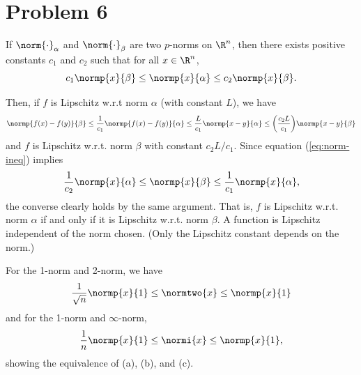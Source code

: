 \documentclass{homework}
\begin{document}
\section{Problem 6}
If $\norm{\cdot}_\alpha$ and $\norm{\cdot}_\beta$ are two $p$-norms on $\R^n$,
then there exists positive constants $c_1$ and $c_2$ such that for all $x\in\R^n$,
\begin{equation}
    c_1 \normp{x}{\beta} \leq \normp{x}{\alpha} \leq c_2 \normp{x}{\beta}.
    \label{eq:norm-ineq}
\end{equation}

Then, if $f$ is Lipschitz w.r.t norm $\alpha$ (with constant $L$), we have
\begin{equation}
    \normp{f(x) - f(y)}{\beta} \leq \frac{1}{c_1} \normp{f(x) - f(y)}{\alpha}
        \leq \frac{L}{c_1} \normp{x - y}{\alpha} \leq \biggl(
            \frac{c_2L}{c_1}
        \biggr) \normp{x - y}{\beta}
\end{equation}
and $f$ is Lipschitz w.r.t. norm $\beta$ with constant $c_2L/c_1$. Since
equation (\ref{eq:norm-ineq}) implies
\begin{equation*}
    \frac{1}{c_2} \normp{x}{\alpha} \leq \normp{x}{\beta}
        \leq \frac{1}{c_1} \normp{x}{\alpha},
\end{equation*}
the converse clearly holds by the same argument. That is, $f$ is Lipschitz
w.r.t. norm $\alpha$ if and only if it is Lipschitz w.r.t. norm $\beta$.
A function is Lipschitz independent of the norm chosen. (Only the Lipschitz
constant depends on the norm.)

For the 1-norm and 2-norm, we have
\begin{equation*}
    \frac{1}{\sqrt{n}} \normp{x}{1} \leq \normtwo{x} \leq \normp{x}{1}
\end{equation*}
and for the 1-norm and $\infty$-norm,
\begin{equation*}
    \frac{1}{n} \normp{x}{1} \leq \normi{x} \leq \normp{x}{1},
\end{equation*}
showing the equivalence of (a), (b), and (c).
\end{document}
